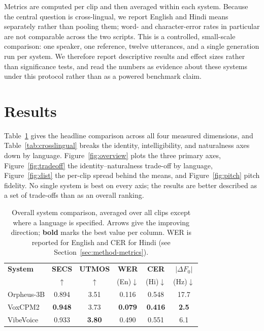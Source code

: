 \documentclass[conference]{IEEEtran}
\begin{document}
Metrics are computed per clip and then averaged within each system. Because
the central question is cross-lingual, we report English and Hindi means
separately rather than pooling them; word- and character-error rates in
particular are not comparable across the two scripts. This is a controlled,
small-scale comparison: one speaker, one reference, twelve utterances, and a
single generation run per system. We therefore report descriptive results and
effect sizes rather than significance tests, and read the numbers as evidence
about these systems under this protocol rather than as a powered benchmark
claim.

\section{Results}
\label{sec:results}

Table~\ref{tab:overall} gives the headline comparison across all four
measured dimensions, and Table~\ref{tab:crosslingual} breaks the identity,
intelligibility, and naturalness axes down by language.
Figure~\ref{fig:overview} plots the three primary axes,
Figure~\ref{fig:tradeoff} the identity--naturalness trade-off by language,
Figure~\ref{fig:dist} the per-clip spread behind the means, and
Figure~\ref{fig:pitch} pitch fidelity. No single system is best on every
axis; the results are better described as a set of trade-offs than as an
overall ranking.

\begin{table}[t]
\caption{Overall system comparison, averaged over all clips except where a
language is specified. Arrows give the improving direction; \textbf{bold} marks
the best value per column. WER is reported for English and CER for Hindi (see
Section~\ref{sec:method-metrics}).}
\label{tab:overall}
\centering
\renewcommand{\arraystretch}{1.2}
\begin{tabular}{lccccc}
\hline
\textbf{System} & \textbf{SECS} & \textbf{UTMOS} & \textbf{WER} & \textbf{CER} & \textbf{$|\Delta F_0|$} \\
 & $\uparrow$ & $\uparrow$ & (En)$\downarrow$ & (Hi)$\downarrow$ & (Hz)$\downarrow$ \\
\hline
Orpheus-3B & 0.894 & 3.51 & 0.116 & 0.548 & 17.7 \\
VoxCPM2 & \textbf{0.948} & 3.73 & \textbf{0.079} & \textbf{0.416} & \textbf{2.5} \\
VibeVoice & 0.933 & \textbf{3.80} & 0.490 & 0.551 & 6.1 \\
\hline
\end{tabular}
\end{table}
\end{document}

